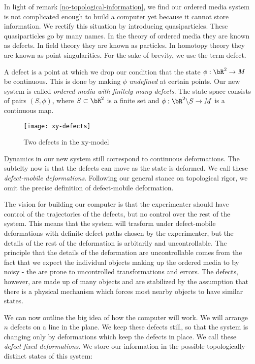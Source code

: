 In light of remark \ref{no-topological-information}, we find our ordered media system is not complicated enough to build a computer yet because it cannot store information. We rectify this situation by introducing quasiparticles. These quasiparticles go by many names. In the theory of ordered media they are known as defects. In field theory they are known as particles. In homotopy theory they are known as point singularities. For the sake of brevity, we use the term defect.

A defect is a point at which we drop our condition that the state $\phi:\bR^2\to M$ be continuous. This is done by making $\phi$ {\em undefined} at certain points. Our new system is called {\em ordered media with finitely many defects}. The state space consists of pairs $(S,\phi)$, where $S\subset \bR^2$ is a finite set and $\phi: \bR^2\backslash S\to M$ is a continuous map.

\begin{figure}
\begin{center}
\texttt{[image: xy-defects]}
\caption{Two defects in the xy-model}
\label{xy-defects}
\end{center}
\end{figure}

Dynamics in our new system still correspond to continuous deformations. The subtelty now is that the defects can move as the state is deformed. We call these {\em defect-mobile deformations}. Following our general stance on topological rigor, we omit the precise definition of defect-mobile deformation. 

The vision for building our computer is that the experimenter should have control of the trajectories of the defects, but no control over the rest of the system. This means that the system will trasform under defect-mobile deformations with definite defect paths chosen by the experimenter, but the details of the rest of the deformation is arbitarily and uncontrollable. The principle that the details of the deformation are uncontrollable comes from the fact that we expect the individual objects making up the ordered media to by noisy - the are prone to uncontrolled transformations and errors. The defects, however, are made up of many objects and are stabilized by the assumption that there is a physical mechanism which forces most nearby objects to have similar states.

We can now outline the big idea of how the computer will work. We will arrange $n$ defects on a line in the plane. We keep these defects still, so that the system is changing only by deformations which keep the defects in place. We call these {\em defect-fixed deformations}. We store our information in the possible topologically-distinct states of this system:

